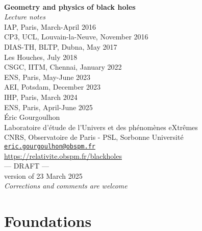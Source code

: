 \documentclass[12pt,a4paper]{book}
\begin{document}
\begin{titlepage}
\
\vspace{4cm}
\begin{center}
{\Huge\textbf{Geometry and physics of black holes}}\\[2ex]
{\Huge\emph{Lecture notes}}\\[3ex]
{\large IAP, Paris, March-April 2016} \\[1ex]
{\large CP3, UCL, Louvain-la-Neuve, November 2016}\\[1ex]
{\large DIAS-TH, BLTP, Dubna, May 2017}\\[1ex]
{\large Les Houches, July 2018}\\[1ex]
{\large CSGC, IITM, Chennai, January 2022}\\[1ex]
{\large ENS, Paris, May-June 2023}\\[1ex]
{\large AEI, Potsdam, December 2023}\\[1ex]
{\large IHP, Paris, March 2024}\\[1ex]
{\large ENS, Paris, April-June 2025}\\[8ex]
Éric Gourgoulhon\\
Laboratoire d’étude de l’Univers et des phénomènes eXtrêmes\\
CNRS, Observatoire de Paris - PSL, Sorbonne Université\\
\href{mailto:eric.gourgoulhon@obspm.fr}{\texttt{eric.gourgoulhon@obspm.fr}}\\[8ex]
\url{https://relativite.obspm.fr/blackholes}\\[8ex]
{\Huge --- DRAFT ---}\\[2ex]
{version of 23 March 2025}\\[2ex]
\emph{\Large Corrections and comments are welcome}
\end{center}
\end{titlepage}


\dominitoc

\newpage


\setcounter{tocdepth}{1}  %
\tableofcontents

\part{Foundations}


\end{document}
